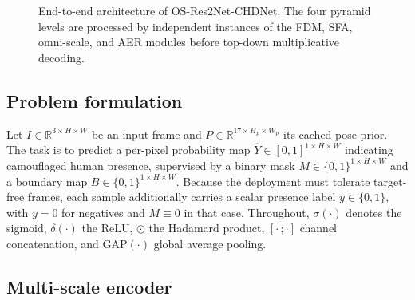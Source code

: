 \documentclass[3p,times,procedia]{elsarticle}
\newcommand{\eltmul}{\odot}
\begin{document}
\begin{figure}[t]
\centering
\caption{End-to-end architecture of OS-Res2Net-CHDNet. The four pyramid levels are processed by independent instances of the FDM, SFA, omni-scale, and AER modules before top-down multiplicative decoding.}
\label{fig:pipeline}
\end{figure}

\subsection{Problem formulation}

Let $I \in \mathbb{R}^{3 \times H \times W}$ be an input frame and $P \in \mathbb{R}^{17 \times H_p \times W_p}$ its cached pose prior. The task is to predict a per-pixel probability map $\hat{Y} \in [0,1]^{1 \times H \times W}$ indicating camouflaged human presence, supervised by a binary mask $M \in \{0,1\}^{1 \times H \times W}$ and a boundary map $B \in \{0,1\}^{1 \times H \times W}$. Because the deployment must tolerate target-free frames, each sample additionally carries a scalar presence label $y \in \{0,1\}$, with $y=0$ for negatives and $M \equiv 0$ in that case. Throughout, $\sigma(\cdot)$ denotes the sigmoid, $\delta(\cdot)$ the ReLU, $\eltmul$ the Hadamard product, $[\cdot\,;\cdot]$ channel concatenation, and $\mathrm{GAP}(\cdot)$ global average pooling.

\subsection{Multi-scale encoder}
\end{document}
